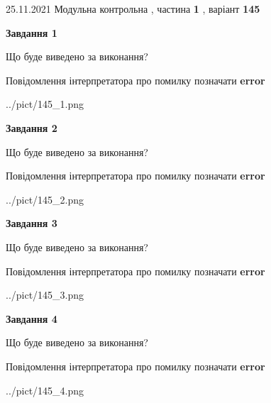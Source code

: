 \documentclass[10pt, ukrainian]{article}
\begin{document}
{25.11.2021 Модульна контрольна , частина \textbf { 1 }, варіант  \No \textbf { 145 }\par}
{
\begin {large}

{\begin {center}\textbf{Завдання 1}\end {center}}\par
Що буде виведено за виконання? \par
Повідомлення інтерпретатора про помилку позначати \textbf{error}

\begin{center}
	{../pict/145_1.png}
\end{center}
\newpage

{\begin {center}\textbf{Завдання 2}\end {center}}\par
Що буде виведено за виконання? \par
Повідомлення інтерпретатора про помилку позначати \textbf{error}

\begin{center}
	{../pict/145_2.png}
\end{center}
\newpage

{\begin {center}\textbf{Завдання 3}\end {center}}\par
Що буде виведено за виконання? \par
Повідомлення інтерпретатора про помилку позначати \textbf{error}

\begin{center}
	{../pict/145_3.png}
\end{center}
\newpage

{\begin {center}\textbf{Завдання 4}\end {center}}\par
Що буде виведено за виконання? \par
Повідомлення інтерпретатора про помилку позначати \textbf{error}

\begin{center}
	{../pict/145_4.png}
\end{center}
\newpage


\end{large}}
\end{document}
